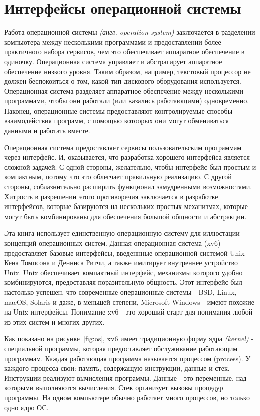 \chapter{Интерфейсы операционной системы}
\label{CH:UNIX}

Работа операционной системы
\emph{(англ. operation system)} заключается
в разделении компьютера между несколькими программами
и предоставлении более практичного набора сервисов,
чем это обеспечивает аппаратное обеспечение
 в одиночку.
Операционная система управляет и абстрагирует
аппаратное обеспечение низкого уровня.
Таким образом, например,
текстовый процессор не должен беспокоиться о том,
какой тип дискового оборудования используется.
Операционная система разделяет
аппаратное обеспечение между несколькими программами,
чтобы они работали (или казались работающими) одновременно.
Наконец, операционные системы предоставляют
контролируемые способы взаимодействия программ,
с помощью котоорых они могут
обмениваться данными и работать вместе.

Операционная система предоставляет сервисы
пользовательским программам через интерфейс.
И, оказывается, что разработка хорошего интерфейса
является сложной задачей.
С одной стороны, желательно,
чтобы интерфейс был простым и компактным,
потому что это облегчает правильную реализацию.
С другой стороны, соблазнительно
расширить функционал замудренными возможностями.
Хитрость в разрешении этого противоречия
заключается в разработке интерфейсов,
которые базируются на нескольких простых механизмах,
которые могут быть комбинированы для обеспечения
большой общности и абстракции.

Эта книга использует единственную операционную систему
для иллюстации концепций операционных систем.
Данная операционная система (xv6)
предоставляет базовые интерфейсы,
введеннные операционной системой Unix~\cite{unix}
Кена Томпсона и Денниса Ритчи,
а также имитирует внутреннее устройство Unix.
Unix обеспечивает компактный интерфейс,
механизмы которого удобно комбинируются,
предоставляя поразительную общность.
Этот интерфейс был настолько успешен,
что современные операционные системы -
BSD, Linux, macOS, Solaris и даже,
в меньшей степени, Microsoft Windows -
имеют похожие на Unix интерфейсы.
Понимание xv6 - это хороший старт для понимания
любой из этих систем и многих других.

Как показано на рисунке~\ref{fig:os},
xv6 имеет традиционную форму ядра \emph{(kernel)} -
специальной программы, которая предоставляет
обслуживание работающим программам.
Каждая работающая программа называется процессом (process).
У каждого процесса свои: память, содержащую инструкции, данные и стек.
Инструкции реализуют вычисления программы. Данные - это переменные,
над которыми выполняются вычисления.
Стек организует вызовы процедур программы.
На одном компьютере обычно работает много процессов,
но только одно ядро ОС.

